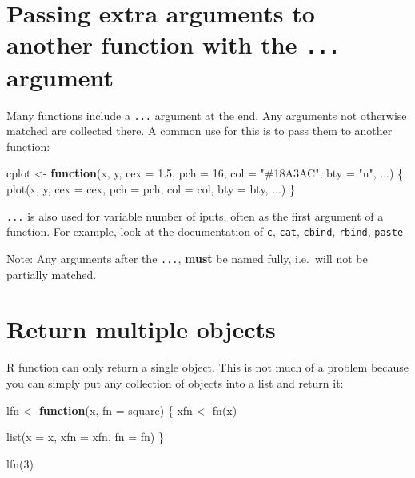 \documentclass[
]{book}
\newenvironment{Shaded}{\begin{snugshade}}{\end{snugshade}}
\newcommand{\AttributeTok}[1]{\textcolor[rgb]{0.77,0.63,0.00}{#1}}
\newcommand{\ControlFlowTok}[1]{\textcolor[rgb]{0.13,0.29,0.53}{\textbf{#1}}}
\newcommand{\DecValTok}[1]{\textcolor[rgb]{0.00,0.00,0.81}{#1}}
\newcommand{\FloatTok}[1]{\textcolor[rgb]{0.00,0.00,0.81}{#1}}
\newcommand{\FunctionTok}[1]{\textcolor[rgb]{0.00,0.00,0.00}{#1}}
\newcommand{\NormalTok}[1]{#1}
\newcommand{\OtherTok}[1]{\textcolor[rgb]{0.56,0.35,0.01}{#1}}
\newcommand{\StringTok}[1]{\textcolor[rgb]{0.31,0.60,0.02}{#1}}
\begin{document}
\hypertarget{passing-extra-arguments-to-another-function-with-the-...-argument}{%
\section{\texorpdfstring{Passing extra arguments to another function with the \texttt{...} argument}{Passing extra arguments to another function with the ... argument}}\label{passing-extra-arguments-to-another-function-with-the-...-argument}}

Many functions include a \texttt{...} argument at the end. Any arguments not otherwise matched are collected there. A common use for this is to pass them to another function:

\begin{Shaded}
\begin{Highlighting}[]
\NormalTok{cplot }\OtherTok{\textless{}{-}} \ControlFlowTok{function}\NormalTok{(x, y,}
                  \AttributeTok{cex =} \FloatTok{1.5}\NormalTok{,}
                  \AttributeTok{pch =} \DecValTok{16}\NormalTok{,}
                  \AttributeTok{col =} \StringTok{"\#18A3AC"}\NormalTok{,}
                  \AttributeTok{bty =} \StringTok{"n"}\NormalTok{, ...) \{}
  \FunctionTok{plot}\NormalTok{(x, y, }\AttributeTok{cex =}\NormalTok{ cex, }\AttributeTok{pch =}\NormalTok{ pch, }\AttributeTok{col =}\NormalTok{ col, }\AttributeTok{bty =}\NormalTok{ bty, ...)}
\NormalTok{                  \}}
\end{Highlighting}
\end{Shaded}

\texttt{...} is also used for variable number of iputs, often as the first argument of a function. For example, look at the documentation of \texttt{c}, \texttt{cat}, \texttt{cbind}, \texttt{rbind}, \texttt{paste}

Note: Any arguments after the \texttt{...}, \textbf{must} be named fully, i.e.~will not be partially matched.

\hypertarget{return-multiple-objects}{%
\section{Return multiple objects}\label{return-multiple-objects}}

R function can only return a single object. This is not much of a problem because you can simply put any collection of objects into a list and return it:

\begin{Shaded}
\begin{Highlighting}[]
\NormalTok{lfn }\OtherTok{\textless{}{-}} \ControlFlowTok{function}\NormalTok{(x, }\AttributeTok{fn =}\NormalTok{ square) \{}
\NormalTok{  xfn }\OtherTok{\textless{}{-}} \FunctionTok{fn}\NormalTok{(x)}
  
  \FunctionTok{list}\NormalTok{(}\AttributeTok{x =}\NormalTok{ x,}
       \AttributeTok{xfn =}\NormalTok{ xfn,}
       \AttributeTok{fn =}\NormalTok{ fn)}
\NormalTok{\}}

\FunctionTok{lfn}\NormalTok{(}\DecValTok{3}\NormalTok{)}
\end{Highlighting}
\end{Shaded}
\end{document}
